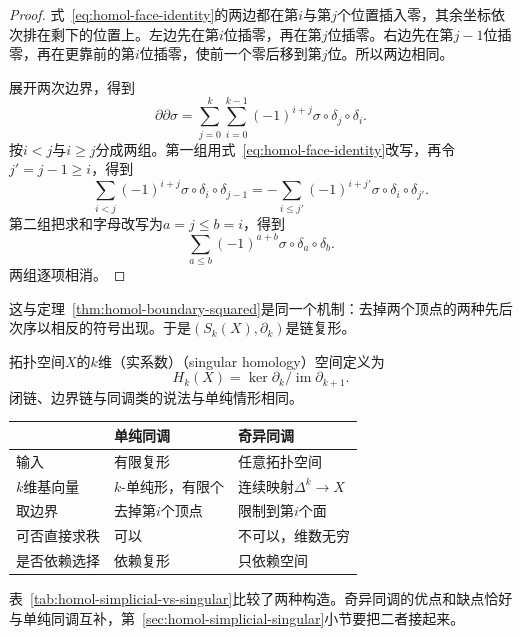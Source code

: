 \begin{proof}
式~\eqref{eq:homol-face-identity}的两边都在第$i$与第$j$个位置插入零，其余坐标依次排在剩下的位置上。左边先在第$i$位插零，再在第$j$位插零。右边先在第$j-1$位插零，再在更靠前的第$i$位插零，使前一个零后移到第$j$位。所以两边相同。

展开两次边界，得到
\[
 \partial\partial\sigma=\sum_{j=0}^k\sum_{i=0}^{k-1}(-1)^{i+j}\sigma\circ\delta_j\circ\delta_i.
\]
按$i<j$与$i\geq j$分成两组。第一组用式~\eqref{eq:homol-face-identity}改写，再令$j'=j-1\geq i$，得到
\[
 \sum_{i<j}(-1)^{i+j}\sigma\circ\delta_i\circ\delta_{j-1}
 =-\sum_{i\leq j'}(-1)^{i+j'}\sigma\circ\delta_i\circ\delta_{j'}.
\]
第二组把求和字母改写为$a=j\leq b=i$，得到
\[
 \sum_{a\leq b}(-1)^{a+b}\sigma\circ\delta_a\circ\delta_b.
\]
两组逐项相消。
\end{proof}

这与定理~\ref{thm:homol-boundary-squared}是同一个机制：去掉两个顶点的两种先后次序以相反的符号出现。于是$(S_k(X),\partial_k)$是链复形。

\begin{definition}[奇异同调]
\label{def:homol-singular-homology}
拓扑空间$X$的$k$维（实系数）（singular homology）空间定义为
\begin{equation}
 H_k(X)=\ker\partial_k/\operatorname{im}\partial_{k+1}.
 \label{eq:homol-singular-homology}
\end{equation}
闭链、边界链与同调类的说法与单纯情形相同。
\end{definition}

\begin{BookInlineTable}
  \centering
  \caption{单纯同调与奇异同调}
  \label{tab:homol-simplicial-vs-singular}
  \begin{tabular}{lll}
    \toprule
    & 单纯同调 & 奇异同调 \\
    \midrule
    输入 & 有限复形 & 任意拓扑空间 \\
    $k$维基向量 & $k$-单纯形，有限个 & 连续映射$\Delta^k\to X$ \\
    取边界 & 去掉第$i$个顶点 & 限制到第$i$个面 \\
    可否直接求秩 & 可以 & 不可以，维数无穷 \\
    是否依赖选择 & 依赖复形 & 只依赖空间 \\
    \bottomrule
  \end{tabular}
\end{BookInlineTable}

表~\ref{tab:homol-simplicial-vs-singular}比较了两种构造。奇异同调的优点和缺点恰好与单纯同调互补，第~\ref{sec:homol-simplicial-singular}小节要把二者接起来。

